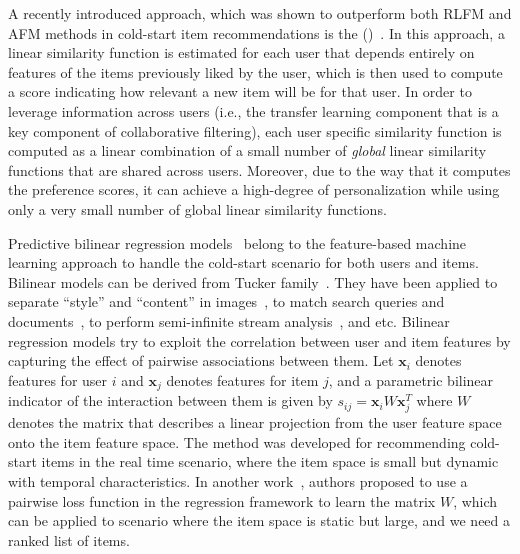 A recently introduced approach, which was shown to outperform both RLFM and AFM
methods in cold-start \TOPN item recommendations is the \CFLINEXP (\CFLIN)~\cite{elbadrawy2015}.
In this approach, a linear similarity function is estimated for each user that
depends entirely on features of the items previously liked by the user, which is
then used to compute a score indicating how relevant a new item will be for that
user. In order to leverage information across users (i.e., the transfer learning
component that is a key component of collaborative filtering), each user
specific similarity function is computed as a linear combination of a small
number of \emph{global} linear similarity functions that are shared across
users. Moreover, due to the way that it computes the preference scores, it can
achieve a high-degree of personalization while using only a very small number of
global linear similarity functions.


Predictive bilinear regression models~\cite{chu09www} belong to the feature-based
machine learning approach to handle the cold-start scenario for both users and
items. Bilinear models can be derived from Tucker family~\cite{tucker66}. They have
been applied to separate ``style'' and ``content'' in images~\cite{tenenbaum00}, to
match search queries and documents~\cite{wu13jmlr}, to perform semi-infinite stream
analysis~\cite{sun06kdd}, and etc. Bilinear regression models try to exploit the
correlation between user and item features by capturing the effect of pairwise
associations between them. Let $\bm{x}_i$ denotes features for user $i$ and $\bm{x}_j$
denotes features for item $j$, and a parametric bilinear indicator of the
interaction between them is given by $s_{ij} = \bm{x}_iW\bm{x}_j^T$ where $W$ denotes
the matrix that describes a linear projection from the user feature space onto
the item feature space. The method was developed for recommending cold-start
items in the real time scenario, where the item space is small but dynamic
with temporal characteristics. In another work~\cite{park09recsys}, authors proposed to
use a pairwise loss function in the regression framework to learn the matrix
$W$, which can be applied to scenario where the item space is static but
large, and we need a ranked list of items.








